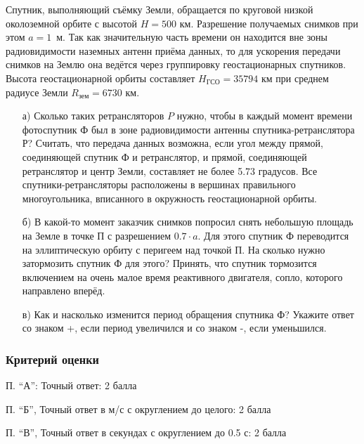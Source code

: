 
Спутник, выполняющий съёмку Земли, обращается по круговой низкой околоземной орбите с высотой $H=500$ км. 
Разрешение получаемых снимков при этом $a=1$~м. Так как значительную часть времени он находится вне зоны 
радиовидимости наземных антенн приёма данных, то для ускорения передачи снимков на Землю она ведётся 
через группировку геостационарных спутников. Высота геостационарной орбиты составляет $H_\text{ГСО} = 35794$ 
км при среднем радиусе Земли $R_{\text{зем}} = 6730$ км. 

\begin{enumerate}
    \item[а)] Сколько таких ретрансляторов $P$ нужно, чтобы в каждый момент времени фотоспутник Ф был в зоне 
радиовидимости антенны спутника-ретранслятора Р? Считать, что передача данных возможна, если угол между прямой, 
соединяющей спутник Ф и ретранслятор, и прямой, 
соединяющей ретранслятор и центр Земли, составляет не более 5.73 градусов. Все спутники-ретрансляторы 
расположены в вершинах правильного многоугольника, вписанного в окружность геостационарной орбиты.

    \item[б)] В какой-то момент заказчик снимков попросил снять небольшую площадь на Земле в точке П с 
    разрешением $0.7 \cdot a$. 
Для этого спутник Ф переводится на эллиптическую орбиту с перигеем над точкой П. На сколько нужно затормозить спутник Ф для этого? 
Принять, что спутник тормозится включением на очень малое время реактивного двигателя, сопло, которого направлено вперёд.

    \item[в)] Как и насколько изменится период обращения спутника Ф? Укажите ответ со знаком +, 
    если период увеличился и со знаком -, если уменьшился.
\end{enumerate}

\subsubsection*{Критерий оценки}

П. “А”: Точный ответ: 2 балла

П. “Б”, Точный ответ в м/с с округлением до целого: 2 балла

П. “В”, Точный ответ в секундах с округлением до 0.5 с: 2 балла

\solutionSection

